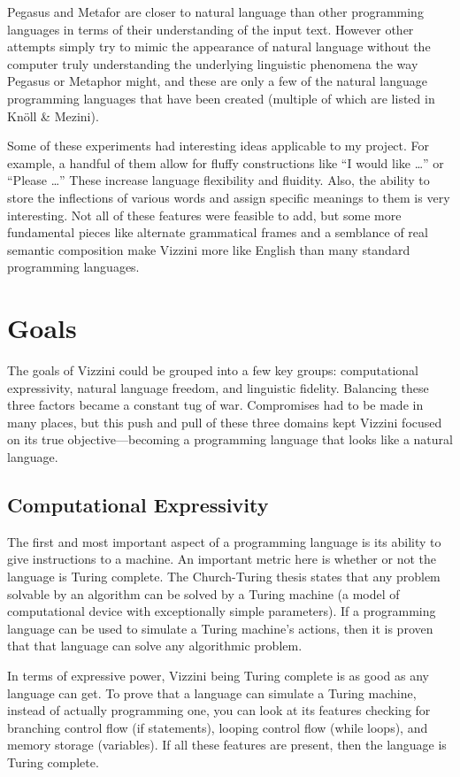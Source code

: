 \documentclass[titlepage]{article}
\newcommand{\langName}{Vizzini}
\begin{document}
Pegasus and Metafor are closer to natural language than other programming languages in terms of their understanding of the input text. However other attempts simply try to mimic the appearance of natural language without the computer truly understanding the underlying linguistic phenomena the way Pegasus or Metaphor might, and these are only a few of the natural language programming languages that have been created (multiple of which are listed in Knöll \& Mezini).

Some of these experiments had interesting ideas applicable to my project. For example, a handful of them allow for fluffy constructions like “I would like …” or “Please …” These increase language flexibility and fluidity. Also, the ability to store the inflections of various words and assign specific meanings to them is very interesting. Not all of these features were feasible to add, but some more fundamental pieces like alternate grammatical frames and a semblance of real semantic composition make \langName{} more like English than many standard programming languages.

\section*{Goals}
The goals of \langName{} could be grouped into a few key groups: computational expressivity, natural language freedom, and linguistic fidelity. Balancing these three factors became a constant tug of war. Compromises had to be made in many places, but this push and pull of these three domains kept \langName{} focused on its true objective---becoming a programming language that looks like a natural language.

\subsection*{Computational Expressivity}
The first and most important aspect of a programming language is its ability to give instructions to a machine. An important metric here is whether or not the language is Turing complete. The Church-Turing thesis states that any problem solvable by an algorithm can be solved by a Turing machine (a model of computational device with exceptionally simple parameters). If a programming language can be used to simulate a Turing machine's actions, then it is proven that that language can solve any algorithmic problem.

In terms of expressive power, \langName{} being Turing complete is as good as any language can get. To prove that a language can simulate a Turing machine, instead of actually programming one, you can look at its features checking for branching control flow (if statements), looping control flow (while loops), and memory storage (variables). If all these features are present, then the language is Turing complete.
\end{document}
